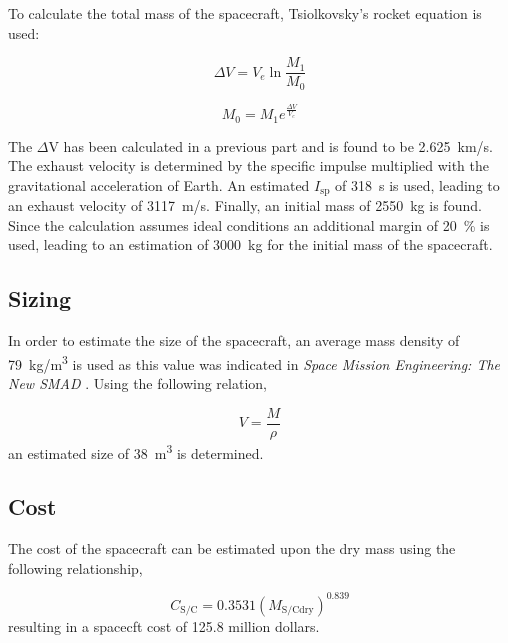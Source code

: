 To calculate the total mass of the spacecraft, Tsiolkovsky's rocket
equation is used:

\begin{equation}
  \Delta V = V_e \ln \frac{M_1}{M_0}
\end{equation}

\begin{equation}
  M_0 = M_1 e^\frac{\Delta V}{V_e}
\end{equation}

The $\Delta$V has been calculated in a previous part and is found to
be \SI{2.625}{km/s}. The exhaust velocity is determined by the
specific impulse multiplied with the gravitational acceleration of
Earth. An estimated $I_{\mathrm{sp}}$ of \SI{318}{s} is used, leading to an
exhaust velocity of \SI{3117}{m/s}. Finally, an initial mass of
\SI{2550}{kg} is found. Since the calculation assumes ideal conditions
an additional margin of \SI{20}{\%} is used, leading to an estimation
of \SI{3000}{kg} for the initial mass of the spacecraft.

\subsection{Sizing}

In order to estimate the size of the spacecraft, an average mass
density of \SI{79}{kg/m^3} is used as this value was indicated in
\textit{Space Mission Engineering: The New SMAD}
\cite{Wertz2011SpaceMissionEng}. Using the following relation,

\begin{equation}
  V = \frac{M}{\rho}
\end{equation}
an estimated size of \SI{38}{m^3} is determined.

\subsection{Cost}

The cost of the spacecraft can be estimated upon the dry mass using
the following relationship\cite{AE1201CourseReader},

\begin{equation}
  C_{\mathrm{S/C}} = 0.3531 (M_{\mathrm{S/Cdry}})^{0.839}
\end{equation}
resulting in a spacecft cost of 125.8 million dollars.



